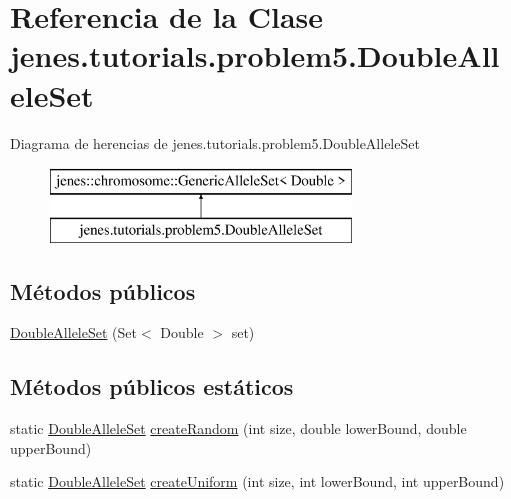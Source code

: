 \hypertarget{classjenes_1_1tutorials_1_1problem5_1_1_double_allele_set}{\section{Referencia de la Clase jenes.\-tutorials.\-problem5.\-Double\-Allele\-Set}
\label{classjenes_1_1tutorials_1_1problem5_1_1_double_allele_set}
}
Diagrama de herencias de jenes.\-tutorials.\-problem5.\-Double\-Allele\-Set\begin{figure}[H]
\begin{center}
\leavevmode
\includegraphics[height=2.000000cm]{classjenes_1_1tutorials_1_1problem5_1_1_double_allele_set}
\end{center}
\end{figure}
\subsection*{Métodos públicos}
\begin{DoxyCompactItemize}
\item 
\hyperlink{classjenes_1_1tutorials_1_1problem5_1_1_double_allele_set_a3669132c61485f50aebe440a0602b2e5}{Double\-Allele\-Set} (Set$<$ Double $>$ set)
\end{DoxyCompactItemize}
\subsection*{Métodos públicos estáticos}
\begin{DoxyCompactItemize}
\item 
static \hyperlink{classjenes_1_1tutorials_1_1problem5_1_1_double_allele_set}{Double\-Allele\-Set} \hyperlink{classjenes_1_1tutorials_1_1problem5_1_1_double_allele_set_ac831f648cab055cd70e3f1b47225529e}{create\-Random} (int size, double lower\-Bound, double upper\-Bound)
\item 
static \hyperlink{classjenes_1_1tutorials_1_1problem5_1_1_double_allele_set}{Double\-Allele\-Set} \hyperlink{classjenes_1_1tutorials_1_1problem5_1_1_double_allele_set_a75aa1cf3be84d1e3f5e50ecc0acc5b4b}{create\-Uniform} (int size, int lower\-Bound, int upper\-Bound)
\end{DoxyCompactItemize}


